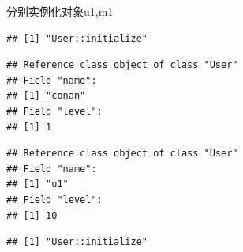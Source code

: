 \documentclass[]{book}
\newenvironment{Shaded}{\begin{snugshade}}{\end{snugshade}}
\newcommand{\KeywordTok}[1]{\textcolor[rgb]{0.13,0.29,0.53}{\textbf{#1}}}
\newcommand{\DataTypeTok}[1]{\textcolor[rgb]{0.13,0.29,0.53}{#1}}
\newcommand{\DecValTok}[1]{\textcolor[rgb]{0.00,0.00,0.81}{#1}}
\newcommand{\StringTok}[1]{\textcolor[rgb]{0.31,0.60,0.02}{#1}}
\newcommand{\CommentTok}[1]{\textcolor[rgb]{0.56,0.35,0.01}{\textit{#1}}}
\newcommand{\OperatorTok}[1]{\textcolor[rgb]{0.81,0.36,0.00}{\textbf{#1}}}
\newcommand{\NormalTok}[1]{#1}
\begin{document}
分别实例化对象u1,m1

\begin{Shaded}
\end{Shaded}

\begin{verbatim}
## [1] "User::initialize"
\end{verbatim}

\begin{Shaded}
\end{Shaded}

\begin{verbatim}
## Reference class object of class "User"
## Field "name":
## [1] "conan"
## Field "level":
## [1] 1
\end{verbatim}

\begin{Shaded}
\end{Shaded}

\begin{verbatim}
## Reference class object of class "User"
## Field "name":
## [1] "u1"
## Field "level":
## [1] 10
\end{verbatim}

\begin{Shaded}
\end{Shaded}

\begin{verbatim}
## [1] "User::initialize"
\end{verbatim}
\end{document}
